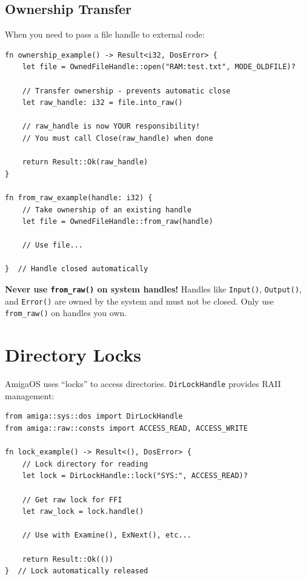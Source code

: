 \subsection{Ownership Transfer}

When you need to pass a file handle to external code:

\begin{lstlisting}
fn ownership_example() -> Result<i32, DosError> {
    let file = OwnedFileHandle::open("RAM:test.txt", MODE_OLDFILE)?

    // Transfer ownership - prevents automatic close
    let raw_handle: i32 = file.into_raw()

    // raw_handle is now YOUR responsibility!
    // You must call Close(raw_handle) when done

    return Result::Ok(raw_handle)
}

fn from_raw_example(handle: i32) {
    // Take ownership of an existing handle
    let file = OwnedFileHandle::from_raw(handle)

    // Use file...

}  // Handle closed automatically
\end{lstlisting}

\begin{warningbox}
\textbf{Never use \texttt{from\_raw()} on system handles!} Handles like \texttt{Input()}, \texttt{Output()}, and \texttt{Error()} are owned by the system and must not be closed. Only use \texttt{from\_raw()} on handles you own.
\end{warningbox}

\section{Directory Locks}
\label{sec:dir-locks}

AmigaOS uses ``locks'' to access directories. \texttt{DirLockHandle} provides RAII management:

\begin{lstlisting}
from amiga::sys::dos import DirLockHandle
from amiga::raw::consts import ACCESS_READ, ACCESS_WRITE

fn lock_example() -> Result<(), DosError> {
    // Lock directory for reading
    let lock = DirLockHandle::lock("SYS:", ACCESS_READ)?

    // Get raw lock for FFI
    let raw_lock = lock.handle()

    // Use with Examine(), ExNext(), etc...

    return Result::Ok(())
}  // Lock automatically released
\end{lstlisting}


